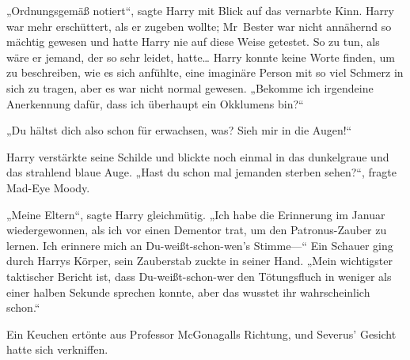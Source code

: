 „Ordnungsgemäß notiert“, sagte Harry mit Blick auf das vernarbte Kinn. Harry war mehr erschüttert, als er zugeben wollte; Mr~Bester war nicht annähernd so mächtig gewesen und hatte Harry nie auf diese Weise getestet. So zu tun, als wäre er jemand, der so sehr leidet, hatte… Harry konnte keine Worte finden, um zu beschreiben, wie es sich anfühlte, eine imaginäre Person mit so viel Schmerz in sich zu tragen, aber es war nicht normal gewesen.
„Bekomme ich irgendeine Anerkennung dafür, dass ich überhaupt ein Okklumens bin?“

„Du hältst dich also schon für erwachsen, was? Sieh mir in die Augen!“

Harry verstärkte seine Schilde und blickte noch einmal in das dunkelgraue und das strahlend blaue Auge. „Hast du schon mal jemanden sterben sehen?“, fragte Mad-Eye Moody.


„Meine Eltern“, sagte Harry gleichmütig. „Ich habe die Erinnerung im Januar wiedergewonnen, als ich vor einen Dementor trat, um den Patronus-Zauber zu lernen. Ich erinnere mich an Du-weißt-schon-wen’s Stimme—“ Ein Schauer ging durch Harrys Körper, sein Zauberstab zuckte in seiner Hand. „Mein wichtigster taktischer Bericht ist, dass Du-weißt-schon-wer den Tötungsfluch in weniger als einer halben Sekunde sprechen konnte, aber das wusstet ihr wahrscheinlich schon.“

Ein Keuchen ertönte aus Professor McGonagalls Richtung, und Severus' Gesicht hatte sich verkniffen.

